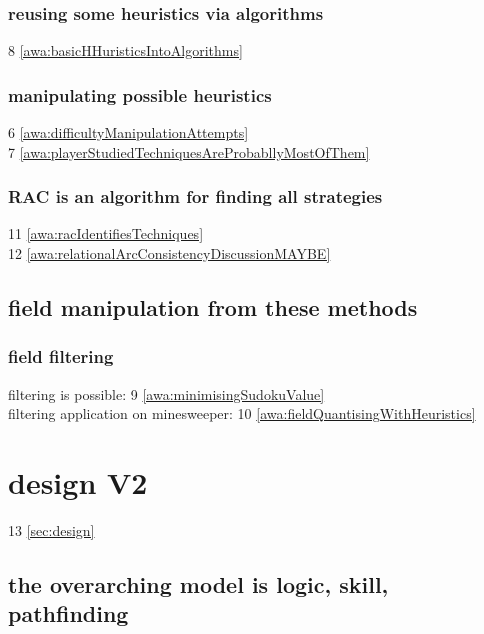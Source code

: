         \subsubsection{reusing some heuristics via algorithms}
             8 \ref{awa:basicHHuristicsIntoAlgorithms}  \\
        \subsubsection{manipulating possible heuristics}
             6 \ref{awa:difficultyManipulationAttempts}  \\
             7 \ref{awa:playerStudiedTechniquesAreProbabllyMostOfThem}  \\
        \subsubsection{RAC is an algorithm for finding all strategies}
            11 \ref{awa:racIdentifiesTechniques}  \\
            12 \ref{awa:relationalArcConsistencyDiscussionMAYBE}  \\
        
    \subsection{field manipulation from these methods}
        \subsubsection{field filtering}
            filtering is possible:
             9 \ref{awa:minimisingSudokuValue}  \\
             filtering application on minesweeper:
            10 \ref{awa:fieldQuantisingWithHeuristics}  \\

\section{design V2}
13 \ref{sec:design}  \\

    \subsection{the overarching model is logic, skill, pathfinding}
